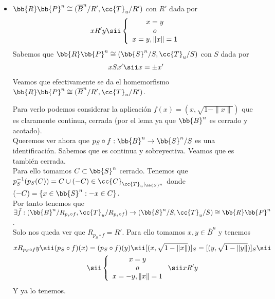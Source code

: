 \begin{ejemplo}
\begin{itemize}
        \item $\bb{R}\bb{P}^n \cong (\overline{B}^n/R', \cc{T}_u/R')$ con $R'$ dada por 
        \begin{align*}
            xR'y \sii \left\{
            \begin{array}{c}
                x=y\\
                o\\
                x=y, \|x\|=1
            \end{array}
            \right.
        \end{align*}
        Sabemos que  $\bb{R}\bb{P}^n \cong (\bb{S}^n/S, \cc{T}_u/S)$ con $S$ dada por 
        \begin{align*}
            xSx' \sii x= \pm x'
        \end{align*}
        Veamos que efectivamente se da el homemorfismo $\bb{R}\bb{P}^n \cong (\overline{B}^n/R', \cc{T}_u/R')$. 

        Para verlo podemos considerar la aplicación $f(x)=(x, \sqrt{1-\|x\|})$ que es claramente continua, cerrada (por el lema ya que $\bb{B}^n$ es cerrado y acotado).\\

        Queremos ver ahora que $p_S \circ f:\bb{B}^n \to \bb{S}^n/S$ es una identificación. Sabemos que es continua y sobreyectiva. Veamos que es también cerrada. \\

        Para ello tomamos $C\subset \bb{S}^n$ cerrado. Tenemos que $p_S^{-1}(p_S(C)) = C \cup (-C) \in \cc{C}_{\cc{T}_u|_{\bb{S}^n}}$ donde $(-C)=\{x\in \bb{S}^n : -x \in C\}$.\\

        Por tanto tenemos que $\exists \tilde{f}:(\bb{B}^n/R_{p_s\circ f}, \cc{T}_u/R_{p_s \circ f}) \to (\bb{S}^n/S, \cc{T}_u/S)\cong \bb{R}\bb{P}^n$.\\

        Solo nos queda ver que $R_{p_S \circ f}=R'$. Para ello tomamos $x,y\in \overline{B}^n$ y tenemos 
        \begin{gather*}
            xR_{p_S\circ f}y \sii (p_S \circ f)(x) = (p_S \circ f)(y) \sii [(x, \sqrt{1-\|x\|})]_S =  [(y, \sqrt{1-\|y\|})]_S \sii\\
            \sii \left\{
            \begin{array}{c}
                x=y\\
                o\\
                x=-y, \|x\|=1
            \end{array}
            \right. \sii xR'y
        \end{gather*}
        Y ya lo tenemos.
    \end{itemize}
    \endsquare
 \end{ejemplo}

